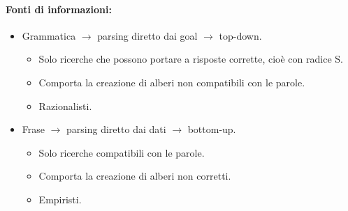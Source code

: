 
\paragraph
{Fonti di informazioni:}

\begin{itemize}
  \item Grammatica $\rightarrow$ parsing diretto dai goal $\rightarrow$ top-down. 
    \begin{itemize}
      \item Solo ricerche che possono portare a risposte corrette, cioè con
radice S. 
      \item Comporta la creazione di alberi non compatibili con le parole. 
      \item Razionalisti.
    \end{itemize}
  \item Frase $\rightarrow$ parsing diretto dai dati $\rightarrow$ bottom-up. 
    \begin{itemize}
      \item Solo ricerche compatibili con le parole. 
      \item Comporta la creazione di alberi non corretti. 
      \item Empiristi.
    \end{itemize}
\end{itemize}







